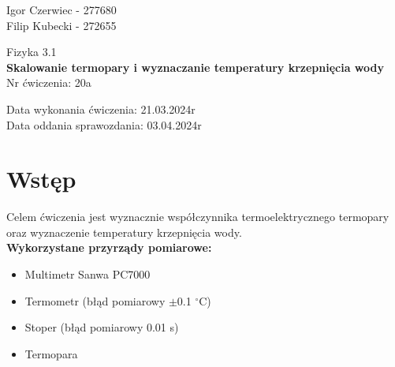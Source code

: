 \documentclass[11pt]{article}
\begin{document}
    \begin{flushright}
        \large{
            Igor Czerwiec - 277680\\
            Filip Kubecki - 272655
        }\\
    \end{flushright}
    \begin{center}
        \large{Fizyka 3.1}\\
        \vspace{2mm}
        \LARGE{\textbf{Skalowanie termopary i wyznaczanie temperatury krzepnięcia wody}}\\
        \vspace{3mm}
        \huge{Nr ćwiczenia: 20a}\\
        \vspace{1cm}
    \end{center}
    \begin{flushright}
        \large{
            Data wykonania ćwiczenia: 21.03.2024r\\
            Data oddania sprawozdania: 03.04.2024r
        }\\
    \end{flushright}

    \section{Wstęp}
    Celem ćwiczenia jest wyznacznie współczynnika termoelektrycznego termopary oraz wyznaczenie temperatury krzepnięcia wody.\\
    \textbf{Wykorzystane przyrządy pomiarowe:}
    \begin{itemize}
        \itemsep0em
        \item Multimetr Sanwa PC7000
        \item Termometr (błąd pomiarowy $\pm$0.1 $^\circ$C)
        \item Stoper (błąd pomiarowy 0.01 s)
        \item Termopara
    \end{itemize}
\end{document}
